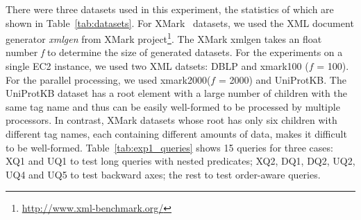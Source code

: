 There were three datasets used in this experiment, the statistics of which are
shown in Table~\ref{tab:datasets}. For XMark~\cite{XMark} datasets, we used the XML document
generator \emph{xmlgen} from XMark
project\footnote{\url{http://www.xml-benchmark.org/}}. The XMark xmlgen takes an
float number \emph{f} to determine the size of generated datasets.  For the
experiments on a single EC2 instance, we used two XML datsets: DBLP and
xmark100 ($f$ = 100). For the parallel processing, we used xmark2000($f$ =
2000) and UniProtKB. The UniProtKB dataset has a root element with a large
number of children with the same tag name and thus can be easily well-formed to
be processed by multiple processors. In contrast, XMark datasets whose root has
only six children  with different tag names, each containing different amounts
of data, makes it difficult to be well-formed. Table~\ref{tab:exp1_queries} shows 15
queries for three cases: XQ1 and UQ1 to test long queries with nested
predicates; XQ2, DQ1, DQ2, UQ2, UQ4 and UQ5 to test backward axes; the rest to
test order-aware queries.

